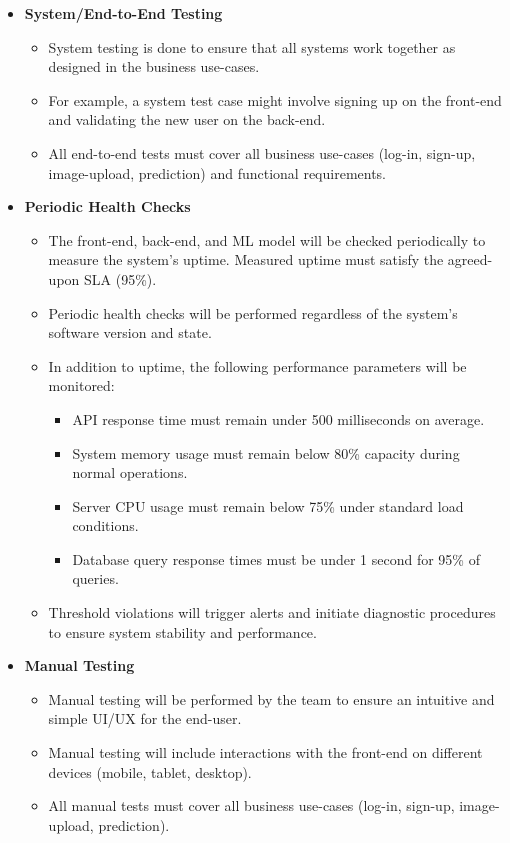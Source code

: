 \documentclass[12pt, titlepage]{article}
\begin{document}
\begin{itemize}
  \item[] {\textbf{System/End-to-End Testing}}
  \begin{itemize}
    \item System testing is done to ensure that all systems work together as designed in the business use-cases.
    \item For example, a system test case might involve signing up on the front-end and validating the new user on the back-end.
    \item All end-to-end tests must cover all business use-cases (log-in, sign-up, image-upload, prediction) and functional requirements.
  \end{itemize}
  
  \item[] {\textbf{Periodic Health Checks}}
  \begin{itemize}
    \item The front-end, back-end, and ML model will be checked periodically to measure the system's uptime. Measured uptime must satisfy the agreed-upon SLA (95\%).
    \item Periodic health checks will be performed regardless of the system's software version and state.
    \item In addition to uptime, the following performance parameters will be monitored:
    \begin{itemize}
      \item API response time must remain under 500 milliseconds on average.
      \item System memory usage must remain below 80\% capacity during normal operations.
      \item Server CPU usage must remain below 75\% under standard load conditions.
      \item Database query response times must be under 1 second for 95\% of queries.
    \end{itemize}
    \item Threshold violations will trigger alerts and initiate diagnostic procedures to ensure system stability and performance.
  \end{itemize}
  
  
  \item[] {\textbf{Manual Testing}}
  \begin{itemize}
    \item Manual testing will be performed by the team to ensure an intuitive and simple UI/UX for the end-user.
    \item Manual testing will include interactions with the front-end on different devices (mobile, tablet, desktop).
    \item All manual tests must cover all business use-cases (log-in, sign-up, image-upload, prediction).
  \end{itemize}
  

\end{itemize}
\end{document}
